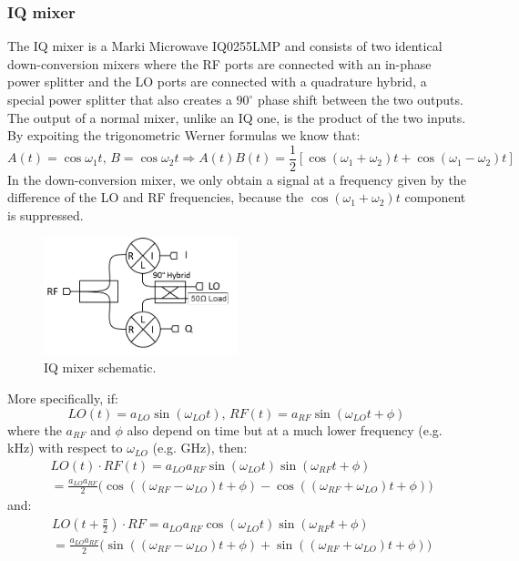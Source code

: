 \documentclass[12pt]{article}
\begin{document}
\subsubsection{IQ mixer}
The IQ mixer is a Marki Microwave IQ0255LMP and consists of two identical down-conversion mixers where the RF ports are connected with an in-phase power splitter and the LO ports are connected with a quadrature hybrid, a special power splitter that also creates a $90^\circ$ phase shift between the two outputs.\\
The output of a normal mixer, unlike an IQ one, is the product of the two inputs. By expoiting the trigonometric Werner formulas we know that:
\begin{equation}
A(t) = \cos \omega_1 t, \, B = \cos \omega_2 t \Rightarrow A(t) B(t) = \frac{1}{2} \left[ \cos (\omega_1 + \omega_2) t + \cos (\omega_1 - \omega_2) t\right]
\end{equation}
In the down-conversion mixer, we only obtain a signal at a frequency given by the difference of the LO and RF frequencies, because the $\cos (\omega_1 + \omega_2) t$ component is suppressed.
\begin{figure}[H]
        \centering
        \includegraphics[width=0.5\textwidth]{iqmixer.png}
        \caption{IQ mixer schematic.}
        \label{IQmix}
    \end{figure}
More specifically, if:
\begin{equation}
LO(t) = a_{LO}\sin(\omega_{LO}t), \, RF(t) = a_{RF}\sin(\omega_{LO}t + \phi)
\end{equation}
where the $a_{RF}$ and $\phi$ also depend on time but at a much lower frequency (e.g. kHz) with respect to $\omega_{LO}$ (e.g. GHz),
then:
\begin{align}
& LO(t) \cdot RF(t) = a_{LO}a_{RF}\sin(\omega_{LO}t)\sin(\omega_{RF}t + \phi)\\
&= \frac{a_{LO}a_{RF}}{2} \Big( \cos((\omega_{RF}-\omega_{LO})t + \phi) - \cos((\omega_{RF} + \omega_{LO}) t + \phi) \Big)
\end{align}
and:
\begin{align}
& LO(t+\frac{\pi}{2})\cdot RF = a_{LO}a_{RF}\cos(\omega_{LO}t)\sin(\omega_{RF}t + \phi)\\
&= \frac{a_{LO}a_{RF}}{2} \Big( \sin((\omega_{RF}-\omega_{LO})t + \phi) + \sin((\omega_{RF}+\omega_{LO}) t  + \phi) \Big)
\end{align}
\end{document}
